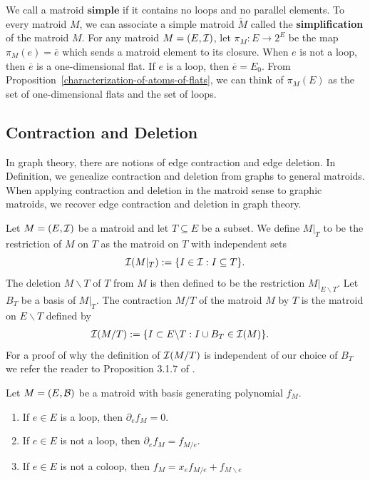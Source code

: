\documentclass{puthesis-UG}
\begin{document}
We call a matroid $\textbf{simple}$ if it contains no loops and no parallel elements. To every matroid $M$, we can associate a simple matroid $\widetilde{M}$ called the \textbf{simplification} of the matroid $M$. For any matroid $M = (E, \mathcal{I})$, let $\pi_M : E \to 2^E$ be the map $\pi_M (e) = \overline{e}$ which sends a matroid element to its closure. When $e$ is not a loop, then $\overline{e}$ is a one-dimensional flat. If $e$ is a loop, then $\overline{e} = E_0$. From Proposition~\ref{characterization-of-atoms-of-flats}, we can think of $\pi_M (E)$ as the set of one-dimensional flats and the set of loops. 

\subsection{Contraction and Deletion}

In graph theory, there are notions of edge contraction and edge deletion. In Definition, we genealize contraction and deletion from graphs to general matroids. When applying contraction and deletion in the matroid sense to graphic matroids, we recover edge contraction and deletion in graph theory.  

\begin{defn}\label{contraction-deletion}
	Let $M = (E, \mathcal{I})$ be a matroid and let $T \subseteq E$ be a subset. We define $M|_T$ to be the restriction of $M$ on $T$ as the matroid on $T$ with independent sets 
	\[
		\mathcal{I} (M|_T) := \{I \in \mathcal{I} : I \subseteq T\}.
	\]
	The deletion $M \backslash T$ of $T$ from $M$ is then defined to be the restriction $M|_{E \backslash T}$. Let $B_T$ be a basis of $M|_T$. The contraction $M / T$ of the matroid $M$ by $T$ is the matroid on $E \backslash T$ defined by
	\begin{align*}
		\mathcal{I}(M/T) & := \{I \subset E \backslash T: I \cup B_T \in \mathcal{I}(M) \}.
	\end{align*}
	For a proof of why the definition of $\mathcal{I}(M/T)$ is independent of our choice of $B_T$ we refer the reader to Proposition 3.1.7 of \cite{10.5555/1197093}.
\end{defn}

\begin{lem}
	Let $M = (E, \mathcal{B})$ be a matroid with basis generating polynomial $f_M$.
	\begin{enumerate}[label = (\alph*)]
		\item If $e \in E$ is a loop, then $\partial_e f_M = 0$. 
		\item If $e \in E$ is not a loop, then $\partial_e f_M = f_{M/e}$. 
		\item If $e \in E$ is not a coloop, then $f_M = x_e f_{M/e} + f_{M \backslash e}$
	\end{enumerate}
\end{lem}
\end{document}
